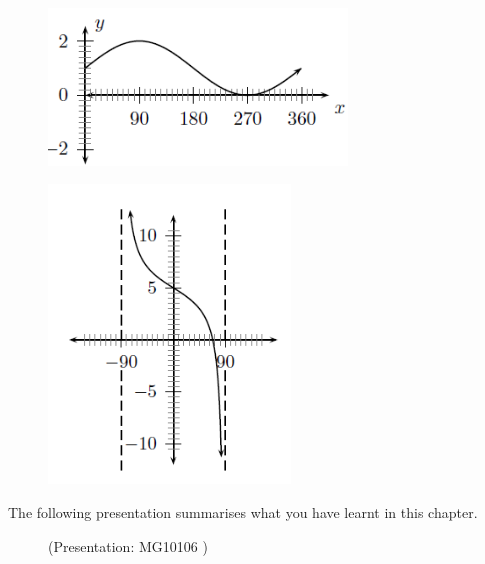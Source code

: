 \begin{enumerate}[noitemsep, label=\textbf{\arabic*}. ]
\begin{figure}[H]
\begin{center}
    \label{m39414*id92162!!!underscore!!!media}\label{m39414*id92162!!!underscore!!!printimage}\includegraphics[width=300px]{col11306.imgs/m39414_trigrep5.png} %
      \vspace{2pt}
    \vspace{.1in}
    \end{center}
 \end{figure}       
    \setcounter{subfigure}{0}
	\begin{figure}[H] %
    \begin{center}
    \label{m39414*id92174!!!underscore!!!media}\label{m39414*id92174!!!underscore!!!printimage}\includegraphics[height=300px]{col11306.imgs/m39414_trigrep6.png} %
      \vspace{2pt}
    \vspace{.1in}
    \end{center}
 \end{figure}               \end{enumerate}
      \label{m39414*eip-749}The following presentation summarises what you have learnt in this chapter.
    \setcounter{subfigure}{0}
	\begin{figure}[H] %
    \label{m39414*slidesharemedia}\label{m39414*slideshareflash} { (Presentation:  MG10106 )}
      \vspace{2pt}
    \vspace{.1in}
 \end{figure}       \par 
